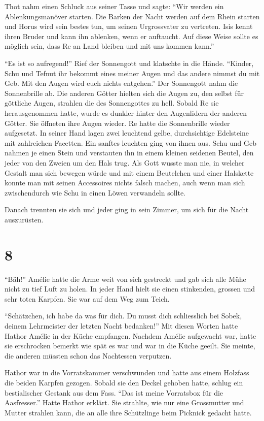 \documentclass[11pt,titlepage,a5paper]{book}
\begin{document}
Thot nahm einen Schluck aus seiner Tasse und sagte: "`Wir werden ein Ablenkungsmanöver starten. Die Barken der Nacht werden auf dem Rhein starten und Horus wird sein bestes tun, um seinen Urgrossvater zu vertreten. Isis kennt ihren Bruder und kann ihn ablenken, wenn er auftaucht. Auf diese Weise sollte es möglich sein, dass Re an Land bleiben und mit uns kommen kann."'

"`Es ist so aufregend!"' Rief der Sonnengott und klatschte in die Hände. "`Kinder, Schu und Tefnut ihr bekommt eines meiner Augen und das andere nimmst du mit Geb. Mit den Augen wird euch nichts entgehen."' Der Sonnengott nahm die Sonnenbrille ab. Die anderen Götter hielten sich die Augen zu, den selbst für göttliche Augen, strahlen die des Sonnengottes zu hell. Sobald Re sie herausgenommen hatte, wurde es dunkler hinter den Augenlidern der anderen Götter. Sie öffneten ihre Augen wieder. Re hatte die Sonnenbrille wieder aufgesetzt. In seiner Hand lagen zwei leuchtend gelbe, durchsichtige Edelsteine mit zahlreichen Facetten. Ein sanftes leuchten ging von ihnen aus. Schu und Geb nahmen je einen Stein und verstauten ihn in einem kleinen seidenen Beutel, den jeder von den Zweien um den Hals trug. Als Gott wusste man nie, in welcher Gestalt man sich bewegen würde und mit einem Beutelchen und einer Halskette konnte man mit seinen Accessoires nichts falsch machen, auch wenn man sich zwischendurch wie Schu in einen Löwen verwandeln sollte.

 Danach trennten sie sich und jeder ging in sein Zimmer, um sich für die Nacht auszurüsten.
 
  \section*{8}
 
 "`Bäh!"' Amélie hatte die Arme weit von sich gestreckt und gab sich alle Mühe nicht zu tief Luft zu holen. In jeder Hand hielt sie einen stinkenden, grossen und sehr toten Karpfen. Sie war auf dem Weg zum Teich.
 
 "`Schätzchen, ich habe da was für dich. Du musst dich schliesslich bei Sobek, deinem Lehrmeister der letzten Nacht bedanken!"' Mit diesen Worten hatte Hathor Amélie in der Küche empfangen. Nachdem Amélie aufgewacht war, hatte sie erschrocken bemerkt wie spät es war und war in die Küche geeilt. Sie meinte, die anderen müssten schon das Nachtessen verputzen.
 
Hathor war in die Vorratskammer verschwunden und hatte aus einem Holzfass die beiden Karpfen gezogen. Sobald sie den Deckel gehoben hatte, schlug ein bestialischer Gestank aus dem Fass. "`Das ist meine Vorratsbox für die Aasfresser."' Hatte Hathor erklärt. Sie strahlte, wie nur eine Grossmutter und Mutter strahlen kann, die an alle ihre Schützlinge beim Picknick gedacht hatte.
\end{document}
